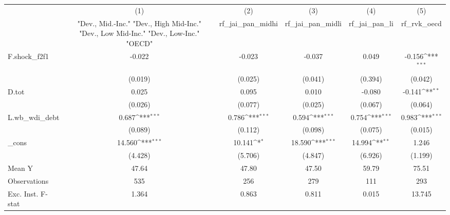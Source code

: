 {
\def\sym#1{\ifmmode^{#1}\else\(^{#1}\)\fi}
\begin{tabular}{l*{5}{c}}
\toprule
            &\multicolumn{1}{c}{(1)}&\multicolumn{1}{c}{(2)}&\multicolumn{1}{c}{(3)}&\multicolumn{1}{c}{(4)}&\multicolumn{1}{c}{(5)}\\
            &\multicolumn{1}{c}{ "Dev., Mid.-Inc." "Dev., High Mid-Inc." "Dev., Low Mid-Inc." "Dev., Low-Inc." "OECD" }&\multicolumn{1}{c}{rf\_jai\_pan\_midhi}&\multicolumn{1}{c}{rf\_jai\_pan\_midli}&\multicolumn{1}{c}{rf\_jai\_pan\_li}&\multicolumn{1}{c}{rf\_rvk\_oecd}\\
\midrule
F.shock\_f2f1&      -0.022         &      -0.023         &      -0.037         &       0.049         &      -0.156\sym{***}\\
            &     (0.019)         &     (0.025)         &     (0.041)         &     (0.394)         &     (0.042)         \\
\addlinespace
D.tot       &       0.025         &       0.095         &       0.010         &      -0.080         &      -0.141\sym{**} \\
            &     (0.026)         &     (0.077)         &     (0.025)         &     (0.067)         &     (0.064)         \\
\addlinespace
L.wb\_wdi\_debt&       0.687\sym{***}&       0.786\sym{***}&       0.594\sym{***}&       0.754\sym{***}&       0.983\sym{***}\\
            &     (0.089)         &     (0.112)         &     (0.098)         &     (0.075)         &     (0.015)         \\
\addlinespace
\_cons      &      14.560\sym{***}&      10.141\sym{*}  &      18.590\sym{***}&      14.994\sym{**} &       1.246         \\
            &     (4.428)         &     (5.706)         &     (4.847)         &     (6.926)         &     (1.199)         \\
\midrule
Mean Y      &       47.64         &       47.80         &       47.50         &       59.79         &       75.51         \\
Observations&         535         &         256         &         279         &         111         &         293         \\
Exc. Inst. F-stat&       1.364         &       0.863         &       0.811         &       0.015         &      13.745         \\
\bottomrule
\end{tabular}
}
